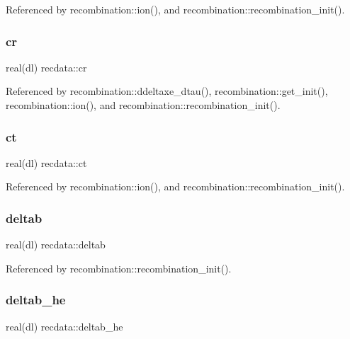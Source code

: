 Referenced by recombination\+::ion(), and recombination\+::recombination\+\_\+init().

\mbox{\label{namespacerecdata_a8ab4f6bed512cd3707c9ee47b17b888c}} 
\subsubsection{\texorpdfstring{cr}{cr}}
{\footnotesize\ttfamily real(dl) recdata\+::cr}



Referenced by recombination\+::ddeltaxe\+\_\+dtau(), recombination\+::get\+\_\+init(), recombination\+::ion(), and recombination\+::recombination\+\_\+init().

\mbox{\label{namespacerecdata_a5b074d69ad1a7e5c8ec138af8ca09905}} 
\subsubsection{\texorpdfstring{ct}{ct}}
{\footnotesize\ttfamily real(dl) recdata\+::ct}



Referenced by recombination\+::ion(), and recombination\+::recombination\+\_\+init().

\mbox{\label{namespacerecdata_a5430ac96b61e841e793860353de75b94}} 
\subsubsection{\texorpdfstring{deltab}{deltab}}
{\footnotesize\ttfamily real(dl) recdata\+::deltab}



Referenced by recombination\+::recombination\+\_\+init().

\mbox{\label{namespacerecdata_ac9a28ec71046fead8431567d914339e5}} 
\subsubsection{\texorpdfstring{deltab\+\_\+he}{deltab\_he}}
{\footnotesize\ttfamily real(dl) recdata\+::deltab\+\_\+he}



